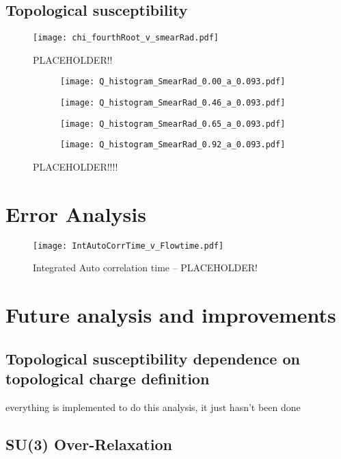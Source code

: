 \documentclass[a4paper,10pt]{article}
\begin{document}
\subsection{Topological susceptibility}
\begin{figure}[H]
\centering
\texttt{[image: chi\_fourthRoot\_v\_smearRad.pdf]}
\caption[]{PLACEHOLDER!!}\label{fig:PLACEHOLDER}
\end{figure}

\begin{figure}[H]\label{figure:Clovers}
\centering
\begin{subfigure}[b]{0.49\textwidth}
\centering
\texttt{[image: Q\_histogram\_SmearRad\_0.00\_a\_0.093.pdf]}
\end{subfigure}
\hfill
\begin{subfigure}[b]{0.49\textwidth}
\centering
\texttt{[image: Q\_histogram\_SmearRad\_0.46\_a\_0.093.pdf]}
\end{subfigure}

\bigskip
\begin{subfigure}[b]{0.49\textwidth}
\centering
\texttt{[image: Q\_histogram\_SmearRad\_0.65\_a\_0.093.pdf]}
\end{subfigure}
\hfill
\begin{subfigure}[b]{0.49\textwidth}
\centering
\texttt{[image: Q\_histogram\_SmearRad\_0.92\_a\_0.093.pdf]}
\end{subfigure}
\caption{PLACEHOLDER!!!!}\label{figure:PLACEHOLDER2}
\end{figure}

\section{Error Analysis}

\begin{figure}[H]
\centering
\texttt{[image: IntAutoCorrTime\_v\_Flowtime.pdf]}
\caption[]{Integrated Auto correlation time -- PLACEHOLDER!}\label{fig:PLACEHOLDER}
\end{figure}
\section{Future analysis and improvements}
\subsection{Topological susceptibility dependence on topological charge definition}
everything is implemented to do this analysis, it just hasn't been done
\subsection{SU(3) Over-Relaxation}
\cite{diffGeom}
\newpage


\end{document}
